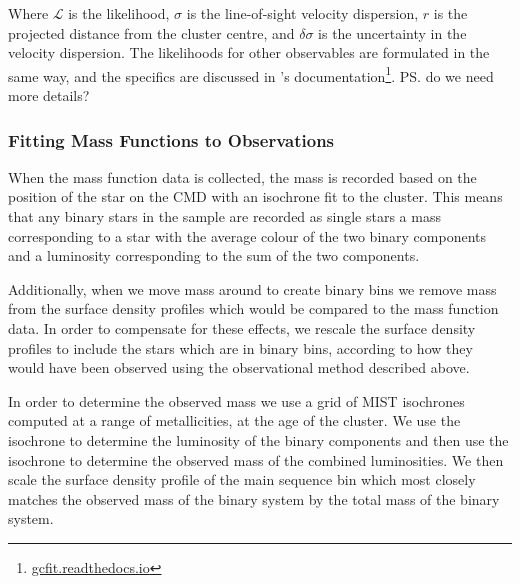 Where $\mathcal{L}$ is the likelihood, $\sigma$ is the line-of-sight velocity dispersion, $r$ is the
projected distance from the cluster centre, and $\delta \sigma$ is the uncertainty in the velocity
dispersion. The likelihoods for other observables are formulated in the same way, and the specifics
are discussed in 's documentation\footnote{\url{gcfit.readthedocs.io}}.
\ps{do we need more details?}




\subsubsection{Fitting Mass Functions to Observations}

When the mass function data is collected, the mass is recorded based on the position of the star on
the CMD with an isochrone fit to the cluster. This means that any binary stars in the sample are
recorded as single stars a mass corresponding to a star with the average colour of the two binary
components and a luminosity corresponding to the sum of the two components.

Additionally, when we move mass around to create binary bins we remove mass from the surface density
profiles which would be compared to the mass function data. In order to compensate for these
effects, we rescale the surface density profiles to include the stars which are in binary bins,
according to how they would have been observed using the observational method described above.

In order to determine the observed mass we use a grid of MIST isochrones computed at a range of
metallicities, at the age of the cluster. We use the isochrone to determine the luminosity of the
binary components and then use the isochrone to determine the observed mass of the combined
luminosities. We then scale the surface density profile of the main sequence bin which most closely
matches the observed mass of the binary system by the total mass of the binary system. 